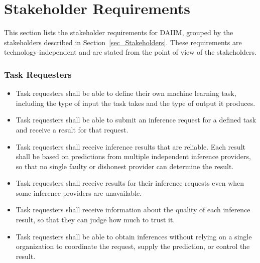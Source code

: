 \documentclass[12pt]{article}
\newcounter{srnum} %
\begin{document}
\section{Stakeholder Requirements}

This section lists the stakeholder requirements for DAIIM, grouped by the stakeholders described in Section~\ref{sec_Stakeholders}. These requirements are technology-independent and are stated from the point of view of the stakeholders.

\subsubsection*{Task Requesters}

\noindent \begin{itemize}

\item[SR\refstepcounter{srnum}\thesrnum \label{SR_DefineTask}] Task requesters shall be able to define their own machine learning task, including the type of input the task takes and the type of output it produces.

\item[SR\refstepcounter{srnum}\thesrnum \label{SR_RequestInference}] Task requesters shall be able to submit an inference request for a defined task and receive a result for that request.

\item[SR\refstepcounter{srnum}\thesrnum \label{SR_ReliableInference}] Task requesters shall receive inference results that are reliable. Each result shall be based on predictions from multiple independent inference providers, so that no single faulty or dishonest provider can determine the result.

\item[SR\refstepcounter{srnum}\thesrnum \label{SR_ResilientService}] Task requesters shall receive results for their inference requests even when some inference providers are unavailable.

\item[SR\refstepcounter{srnum}\thesrnum \label{SR_ResultQuality}] Task requesters shall receive information about the quality of each inference result, so that they can judge how much to trust it.

\item[SR\refstepcounter{srnum}\thesrnum \label{SR_NoCentralAuthority}] Task requesters shall be able to obtain inferences without relying on a single organization to coordinate the request, supply the prediction, or control the result.


\end{itemize}
\end{document}

